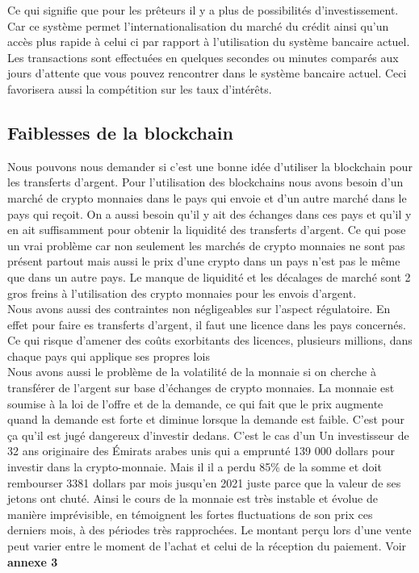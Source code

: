 \documentclass[12pt]{report}
\begin{document}
\begin{enumerate}
\hspace{1cm} Ce qui signifie que pour les prêteurs il y a plus de possibilités d’investissement. Car ce système permet l’internationalisation du marché du crédit ainsi qu’un accès plus rapide à celui ci par rapport à l’utilisation du système bancaire actuel. Les transactions sont effectuées en quelques secondes ou minutes comparés aux jours d’attente que vous pouvez rencontrer dans le système bancaire actuel. Ceci favorisera aussi la compétition sur les taux d'intérêts.

\end{enumerate}

    \subsection{Faiblesses de la blockchain}
\hspace{1cm} Nous pouvons nous demander si c'est une bonne idée d'utiliser la blockchain pour les transferts d’argent. Pour l'utilisation des blockchains nous avons besoin d’un marché de crypto monnaies dans le pays qui envoie et d’un autre marché dans le pays qui reçoit. On a aussi besoin qu’il y ait des échanges dans ces pays et qu’il y en ait suffisamment pour obtenir la liquidité des transferts d’argent. Ce qui pose un vrai problème car non seulement les marchés de crypto monnaies ne sont pas présent partout mais aussi le prix d’une crypto dans un pays n’est pas le même que dans un autre pays. Le manque de liquidité et les décalages de marché sont 2 gros freins à l’utilisation des crypto monnaies pour les envois d’argent.\\

\hspace{1cm} Nous avons aussi des contraintes non négligeables sur l’aspect régulatoire. En effet pour faire es transferts d’argent, il faut une licence dans les pays concernés. Ce qui risque d'amener des coûts exorbitants des licences, plusieurs millions, dans chaque pays qui applique ses propres lois\\

\hspace{1cm} Nous avons aussi le problème de la volatilité de la monnaie si on cherche à transférer de l’argent sur base d’échanges de crypto monnaies. La monnaie est soumise à la loi de l'offre et de la demande, ce qui fait que le prix augmente quand la demande est forte et diminue lorsque la demande est faible. C'est pour ça qu'il est jugé dangereux d'investir dedans. C'est le cas d'un Un investisseur de 32 ans originaire des Émirats arabes unis qui a emprunté 139 000 dollars pour investir dans la crypto-monnaie. Mais il il a perdu 85\% de la somme et doit rembourser 3381 dollars par mois jusqu’en 2021 juste parce que la valeur de ses jetons ont chuté. Ainsi le cours de la monnaie est très instable et évolue de manière imprévisible, en témoignent les fortes fluctuations de son prix ces derniers mois, à des périodes très rapprochées. Le montant perçu lors d'une vente peut varier entre le moment de l'achat et celui de la réception du paiement. Voir \textbf{annexe 3} \\
\end{document}
